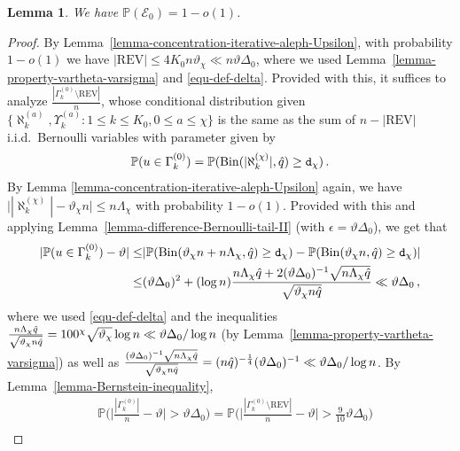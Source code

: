 \documentclass[11pt]{article}
\def\P{\mathbb{P}}
\newtheorem{Lemma}[Theorem]{Lemma}
\numberwithin{equation}{section}
\begin{document}
\begin{Lemma}
\label{lemma-E-0-holds}
We have $\P(\mathcal{E}_{0}) = 1-o(1)$.
\end{Lemma}
\begin{proof}
By Lemma~\ref{lemma-concentration-iterative-aleph-Upsilon}, with probability $1-o(1)$ we have $|\mathrm{REV}| \leq 4K_0 n \vartheta_{\chi} \ll n \vartheta \Delta_{0}$, where we used Lemma~\ref{lemma-property-vartheta-varsigma} and \eqref{equ-def-delta}. Provided with this, it suffices to analyze $\frac{|\Gamma^{(0)}_k \setminus \mathrm{REV}|}{n}$, whose conditional distribution given $\{ \aleph^{(a)}_k, \Upsilon^{(a)}_k: 1\leq k\leq K_0, 0\leq a\leq \chi\}$ is the same as the sum of $n-|\mathrm{REV}|$ i.i.d.\ Bernoulli variables with parameter given by
\begin{align*}
    \mathbb{P}( u \in \Gamma^{(0)}_k ) = \mathbb{P}( \mathrm{Bin}(|\aleph^{(\chi)}_k|,\Hat{q}) \geq \mathtt{d}_{\chi} ) \,.
\end{align*}
By Lemma \ref{lemma-concentration-iterative-aleph-Upsilon} again, we have $\Big| |\aleph^{(\chi)}_k|- \vartheta_{\chi} n \Big| \leq n \Lambda_{\chi}$ with probability $1-o(1)$. Provided with this and applying Lemma~\ref{lemma-difference-Bernoulli-tail-II} (with $\epsilon=\vartheta \Delta_0$), we get that
\begin{align*}
    | \mathbb{P}( u \in \Gamma^{(0)}_k ) - \vartheta|
    \leq & | \mathbb{P} ( \mathrm{Bin}(\vartheta_{\chi} n + n \Lambda_{\chi} ,\Hat{q}) \geq \mathtt{d}_{\chi} ) - \mathbb{P} (\mathrm{Bin}(\vartheta_{\chi} n, \Hat{q}) \geq \mathtt{d}_{\chi} )  | \\
    \leq & (\vartheta \Delta_0)^2 + (\log n) \frac{ n \Lambda_{\chi} \Hat{q} + 2 (\vartheta \Delta_0)^{-1} \sqrt{ n \Lambda_{\chi} \Hat{q} }  }{ \sqrt{\vartheta_{\chi} n \Hat{q}} } \ll \vartheta \Delta_0\,,
\end{align*}
where we used \eqref{equ-def-delta} and the inequalities $\frac{ n \Lambda_{\chi} \Hat{q}  }{ \sqrt{\vartheta_{\chi} n \Hat{q}} } = 100^\chi\sqrt{\vartheta_{\chi}} \log n \ll \vartheta \Delta_{0}/\log n$ (by Lemma~\ref{lemma-property-vartheta-varsigma}) as well as $\frac{ (\vartheta \Delta_0)^{-1} \sqrt{ n \Lambda_{\chi} \Hat{q} }  }{ \sqrt{\vartheta_{\chi} n \Hat{q}} } = (n \Hat{q})^{- \frac{1}{4}} (\vartheta \Delta_0)^{-1} \ll \vartheta \Delta_0/\log n$. By Lemma~\ref{lemma-Bernstein-inequality}, 
\begin{align}
    & \mathbb{P} \Big(\Big| \frac{|\Gamma^{(0)}_k|}{n} - \vartheta \Big| > \vartheta \Delta_{0} \Big) = \mathbb{P} \Big( \Big| \frac{|\Gamma^{(0)}_k \setminus \mathrm{REV}|}{n} - \vartheta \Big| > \frac{9}{10} \vartheta \Delta_{0}  \Big)  \nonumber\\

\end{align}
\end{proof}
\end{document}
